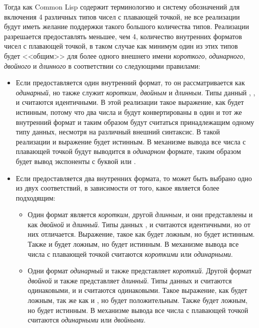 Тогда как Common Lisp содержит терминологию и систему обозначений для
включения 4 различных типов чисел с плавающей точкой, не все реализации будут
иметь желание поддержки такого большого количества типов.
Реализации разрешается предоставлять меньшее, чем 4, количество внутренних
форматов чисел с плавающей точкой, в таком случае как минимум один из этих типов
будет <<общим>> для более одного внешнего имени \emph{короткого}, \emph{одинарного},
\emph{двойного} и \emph{длинного} в соответствии со следующими правилами:
\begin{itemize}
\item
Если предоставляется один внутренний формат, то он рассматривается как
\emph{одинарный}, но также служит \emph{коротким}, \emph{двойным} и
\emph{длинным}.
Типы данный , ,  и
 считаются идентичными. В этой реализации такое выражение, как
 будет истинным, потому что два числа  и
 будут конвертированы в один и тот же внутренний формат и таким
образом будут считаться принадлежащим одному типу данных, несмотря на различный
внешний синтаксис.
В такой реализации и выражение  будет истинным.
В механизме вывода все числа с плавающей точкой будут выводится в
\emph{одинарном} формате, таким образом будет вывод экспоненты  с буквой 
или .
\item
Если предоставляется два внутренних формата, то может быть выбрано одно из двух
соответствий, в зависимости от того, какое является более подходящим:
\begin{itemize}
\item
Один формат является \emph{коротким}, другой \emph{длинным}, и они представлены
и как \emph{двойной} и \emph{длинный}.
Типы данных ,  и  считаются
идентичными, но  от них отличается.
Выражение, такое как  будет ложным, но  будет истинным. Также и  будет ложным,
но  будет истинным.
В механизме вывода все числа с плавающей точкой считаются \emph{короткими} или
\emph{одинарными}.

\item 
Одни формат \emph{одинарный} и также представляет \emph{короткий}.
Другой формат \emph{двойной} и также представляет \emph{длинный}.
Типы данных  и  считаются
одинаковыми, и  и  считаются одинаковыми.
Такое выражение, как  будет ложным, так же как и , но  будет положительным.
Также  будет ложным, но  будет истинным.
В механизме вывода все числа с плавающей точкой считаются \emph{одинарными} или
\emph{двойными}.
\end{itemize}


\end{itemize}
